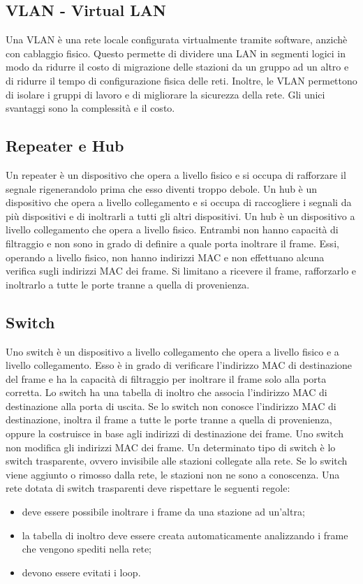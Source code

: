 \documentclass[12pt]{report}
\begin{document}
\subsection{VLAN - Virtual LAN}
Una VLAN è una rete locale configurata virtualmente tramite software, anzichè con cablaggio fisico. Questo permette di dividere una LAN in segmenti logici in modo da ridurre il costo di migrazione delle stazioni da un gruppo ad un altro e di ridurre il tempo di configurazione fisica delle reti. Inoltre, le VLAN permettono di isolare i gruppi di lavoro e di migliorare la sicurezza della rete. Gli unici svantaggi sono la complessità e il costo.

\subsection{Repeater e Hub}
Un repeater è un dispositivo che opera a livello fisico e si occupa di rafforzare il segnale rigenerandolo prima che esso diventi troppo debole. Un hub è un dispositivo che opera a livello collegamento e si occupa di raccogliere i segnali da più dispositivi e di inoltrarli a tutti gli altri dispositivi. Un hub è un dispositivo a livello collegamento che opera a livello fisico. Entrambi non hanno capacità di filtraggio e non sono in grado di definire a quale porta inoltrare il frame. Essi, operando a livello fisico, non hanno indirizzi MAC e non effettuano alcuna verifica sugli indirizzi MAC dei frame. Si limitano a ricevere il frame, rafforzarlo e inoltrarlo a tutte le porte tranne a quella di provenienza.

\subsection{Switch}
Uno switch è un dispositivo a livello collegamento che opera a livello fisico e a livello collegamento. Esso è in grado di verificare l'indirizzo MAC di destinazione del frame e ha la capacità di filtraggio per inoltrare il frame solo alla porta corretta. Lo switch ha una tabella di inoltro che associa l'indirizzo MAC di destinazione alla porta di uscita. Se lo switch non conosce l'indirizzo MAC di destinazione, inoltra il frame a tutte le porte tranne a quella di provenienza, oppure la costruisce in base agli indirizzi di destinazione dei frame. Uno switch non modifica gli indirizzi MAC dei frame. Un determinato tipo di switch è lo switch trasparente, ovvero invisibile alle stazioni collegate alla rete. Se lo switch viene aggiunto o rimosso dalla rete, le stazioni non ne sono a conoscenza. Una rete dotata di switch trasparenti deve rispettare le seguenti regole:
\begin{itemize}
	\item deve essere possibile inoltrare i frame da una stazione ad un'altra;
	\item la tabella di inoltro deve essere creata automaticamente analizzando i frame che vengono spediti nella rete;
	\item devono essere evitati i loop.
\end{itemize}
\end{document}
